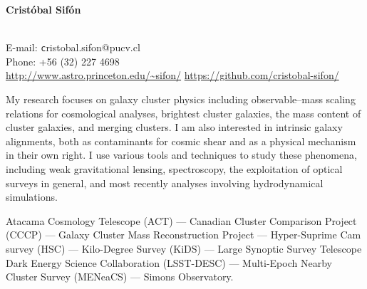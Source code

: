 \documentclass[11pt]{article}
\begin{document}
\begin{minipage}[b]{0.46\linewidth}
\flushleft
\hspace{-0.7cm}
{\bf\huge Crist\'obal Sif\'on}\\\vspace{0.2cm}
\\
\end{minipage}
\begin{minipage}[b]{0.49\linewidth}
\flushright
{\large E-mail: {\texttt cristobal.sifon@pucv.cl}\\
        Phone: +56 (32) 227 4698\\
        \url{http://www.astro.princeton.edu/~sifon/}
        \url{https://github.com/cristobal-sifon/}}
\end{minipage}
\vspace{0.4cm}
\hline




My research focuses on galaxy cluster physics including observable--mass scaling relations for cosmological analyses, brightest cluster galaxies, the mass content of cluster galaxies, and merging clusters. I am also interested in intrinsic galaxy alignments, both as contaminants for cosmic shear and as a physical mechanism in their own right. I use various tools and techniques to study these phenomena, including weak gravitational lensing, spectroscopy, the exploitation of optical surveys in general, and most recently analyses involving hydrodynamical simulations.

\vspace{0.5cm}
{
 Atacama Cosmology Telescope (ACT) ---
 Canadian Cluster Comparison Project (CCCP) ---
 Galaxy Cluster Mass Reconstruction Project ---
 Hyper-Suprime Cam survey (HSC) ---
 Kilo-Degree Survey (KiDS) ---
 Large Synoptic Survey Telescope Dark Energy Science Collaboration (LSST-DESC) ---
 Multi-Epoch Nearby Cluster Survey (MENeaCS) ---
 Simons Observatory.
}
\end{document}
